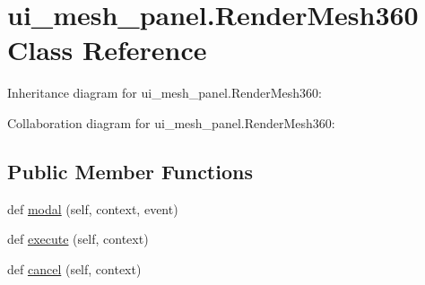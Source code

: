 \hypertarget{classui__mesh__panel_1_1RenderMesh360}{}\section{ui\+\_\+mesh\+\_\+panel.\+Render\+Mesh360 Class Reference}
\label{classui__mesh__panel_1_1RenderMesh360}


Inheritance diagram for ui\+\_\+mesh\+\_\+panel.\+Render\+Mesh360\+:


Collaboration diagram for ui\+\_\+mesh\+\_\+panel.\+Render\+Mesh360\+:
\subsection*{Public Member Functions}
\begin{DoxyCompactItemize}
\item 
def \hyperlink{classui__mesh__panel_1_1RenderMesh360_ae63bd81bc80ea41d6b617cee289ebdb5}{modal} (self, context, event)
\item 
def \hyperlink{classui__mesh__panel_1_1RenderMesh360_ab35d6526427d96e85d3e20a08159f3ab}{execute} (self, context)
\item 
def \hyperlink{classui__mesh__panel_1_1RenderMesh360_a3a086cce1bf70570958df08e8a73ecf9}{cancel} (self, context)
\end{DoxyCompactItemize}
